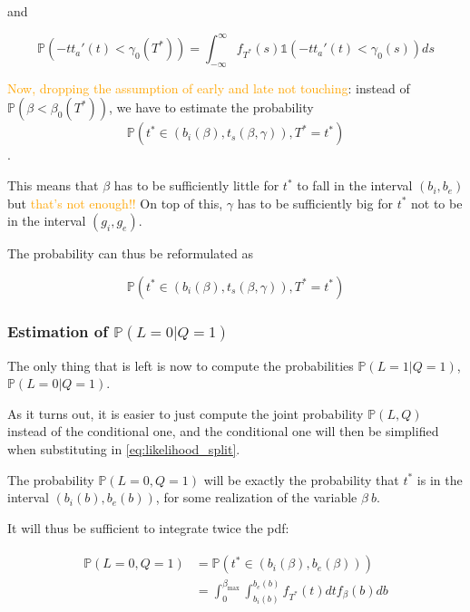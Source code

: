 \documentclass{article}
\begin{document}
and

\begin{equation*}
  \mathbb{P}(-tt_a'(t) < \gamma_0(T^*)) = \int_{-\infty}^\infty f_{T^*}(s) \mathbb{1}(-tt_a'(t) < \gamma_0(s)) ds
\end{equation*}

\textcolor{orange}{Now, dropping the assumption of early and late not touching}:
instead of \(\mathbb{P}(\beta < \beta_0(T^*))\),
we have to estimate the probability
\[\mathbb{P}(t^* \in (b_i(\beta), t_s(\beta, \gamma)), T^* = t^*)\].

This means that \(\beta\) has to be sufficiently little for \(t^*\) to fall in the interval \((b_i, b_e)\) but \textcolor{orange}{that's not enough!!}
On top of this, \(\gamma\) has to be sufficiently big for \(t^*\) not to be in the interval \((g_i, g_e)\).

The probability can thus be reformulated as

\begin{equation}
  \label{eq:prob_gamabeta}
  \mathbb{P}(t^* \in (b_i(\beta), t_s(\beta, \gamma)), T^* = t^*) 
\end{equation}

\subsubsection{Estimation of $\mathbb{P}(L=0 | Q=1)$}

The only thing that is left is now to compute the probabilities \(\mathbb{P}(L=1 | Q=1)\), \(\mathbb{P}(L=0 | Q=1)\).

As it turns out, it is easier to just compute the joint probability \(\mathbb{P}(L, Q)\) instead of the conditional one, and the conditional one will then be simplified when substituting in \eqref{eq:likelihood_split}.

The probability \(\mathbb{P}(L=0, Q=1)\) will be exactly the probability that \(t^*\) is in the interval \((b_i(b), b_e(b))\), for some realization of the variable \(\beta\ b\).

It will thus be sufficient to integrate twice the pdf:

\begin{align}
  \label{eq:prob_int_beta}
  \begin{split}
    \mathbb{P}(L=0, Q=1) & =\mathbb{P}(t^* \in (b_i(\beta), b_e(\beta))) \\
    & = \int_0^{\beta_\text{max}}\int_{b_i(b)}^{b_e(b)} f_{T^*}(t)dtf_\beta(b)db
      \end{split}
\end{align}
\end{document}
